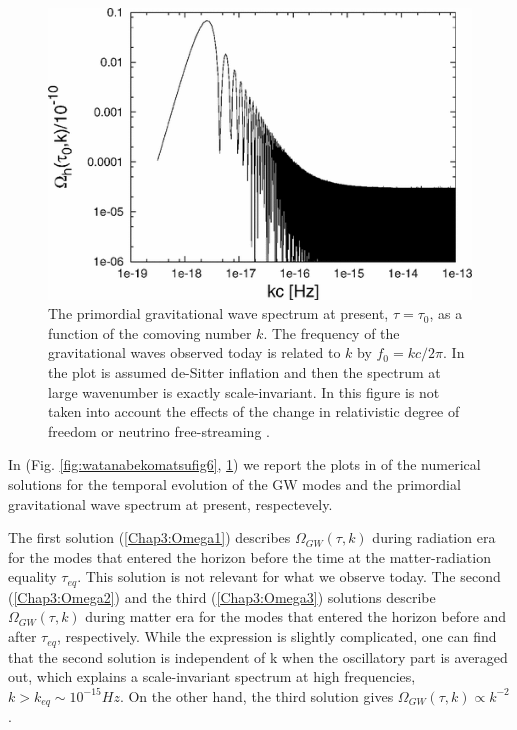 \documentclass[11pt,a4paper,twoside]{book}
\begin{document}
\begin{figure}
	\centering
	\includegraphics[width=0.7\linewidth, height=0.25\textheight]{Images/Chap3/Watanabe_Komatsu_Fig1}
	\caption{The primordial gravitational wave spectrum at present, $\tau=\tau_{0}$, as a function of the comoving number $ k $. The frequency of the gravitational waves observed today is related to $ k $ by $ f_{0}=kc/2\pi $. In the plot is assumed de-Sitter inflation and then the spectrum at large wavenumber is exactly scale-invariant. In this figure is not taken into account the effects of the change in relativistic degree of freedom or neutrino free-streaming \cite{Chap3:GW_Watanabe_Komatsu}.}
	\label{fig:watanabekomatsufig1}
\end{figure}

In (Fig. \ref{fig:watanabekomatsufig6}, \ref{fig:watanabekomatsufig1}) we report the plots in \cite{Chap3:GW_Watanabe_Komatsu} of the  numerical solutions for the temporal evolution of the GW modes and the primordial gravitational wave spectrum at present, respectevely.

The first solution (\ref{Chap3:Omega1}) describes $ \Omega_{GW}(\tau,k) $ during radiation era for the modes that entered the horizon before the time at the matter-radiation equality $ \tau_{eq} $. This solution is not relevant for what we observe today. The second (\ref{Chap3:Omega2}) and the third (\ref{Chap3:Omega3}) solutions describe $\Omega_{GW}(\tau,k)$ during matter era for the modes that entered the horizon before and after $\tau_{eq}$, respectively. While the expression is slightly complicated, one can find that the second solution is independent of k when the oscillatory part is averaged out, which explains  a scale-invariant spectrum at high frequencies, $ k>k_{eq} \sim 10^{-15} Hz $. On the other hand, the third solution gives $ \Omega_{GW}(\tau,k) \propto k^{-2} $.
\end{document}

